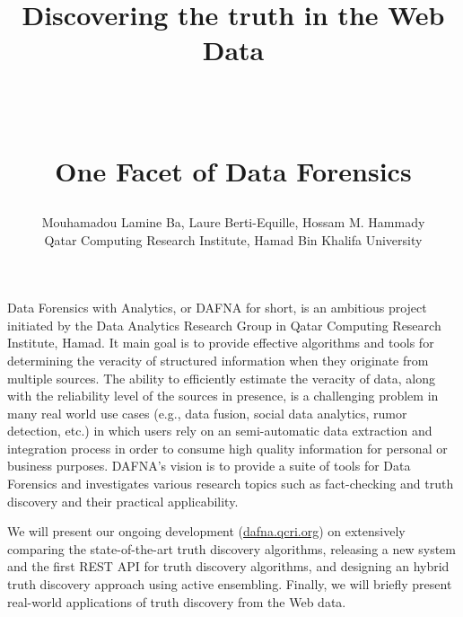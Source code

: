 \documentclass[paper=a4, fontsize=11pt]{scrartcl}	%
\title{ \vspace{-1in} 	\usefont{OT1}{bch}{b}{n}
		\huge \strut Discovering the truth in the Web Data\strut \\
		\Large \bfseries \strut One Facet of Data Forensics\strut
}
\author{ 									\usefont{OT1}{bch}{m}{n}
        Mouhamadou Lamine Ba, Laure Berti-Equille, Hossam M. Hammady\\		\usefont{OT1}{bch}{m}{n}
        Qatar Computing Research Institute, Hamad Bin Khalifa University\\	\usefont{OT1}{bch}{m}{n}
}
\date{}
\numberwithin{equation}{section}															%
\numberwithin{figure}{section}																%
\numberwithin{table}{section}																%
\begin{document}
\maketitle
 \vspace*{-1.5cm}
 
 Data Forensics with Analytics, or DAFNA for short, is an ambitious project initiated by the Data Analytics Research Group in Qatar Computing Research
 Institute, Hamad. It main goal is to provide effective algorithms and tools for determining the veracity of structured information when they originate
 from  multiple sources. The ability to efficiently estimate the veracity of data, along with the reliability level of the sources in presence, is a challenging
 problem in many real world use cases (e.g., data fusion, social data analytics, rumor detection, etc.) in which users rely on an semi-automatic data extraction
 and integration process in order to consume high quality information for personal or business purposes. DAFNA's vision is to provide a suite of tools for Data
 Forensics and investigates various research topics such as fact-checking and truth discovery and their practical applicability.

We will present our ongoing development (\url{dafna.qcri.org}) on extensively comparing the state-of-the-art truth discovery algorithms, releasing a new system and 
the first REST API for truth discovery algorithms, and designing an hybrid truth discovery approach using active ensembling. Finally, we will briefly present real-world
applications of truth discovery from the Web data.
 
\end{document}
